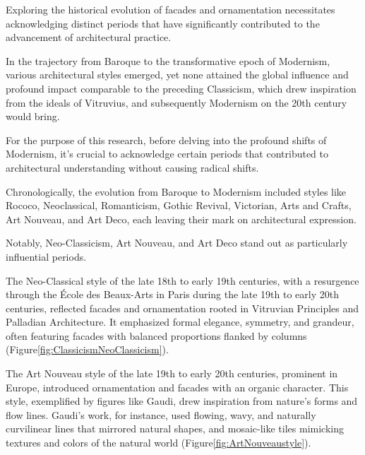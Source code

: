 
Exploring the historical evolution of facades and ornamentation necessitates acknowledging distinct periods that have significantly contributed to the advancement of architectural practice.

In the trajectory from Baroque to the transformative epoch of Modernism, various architectural styles emerged, yet none attained the global influence and profound impact comparable to the preceding Classicism, which drew inspiration from the ideals of Vitruvius, and subsequently Modernism on the 20th century would bring.

For the purpose of this research, before delving into the profound shifts of Modernism, it's crucial to acknowledge certain periods that contributed to architectural understanding without causing radical shifts.

Chronologically, the evolution from Baroque to Modernism included styles like Rococo, Neoclassical, Romanticism, Gothic Revival, Victorian, Arts and Crafts, Art Nouveau, and Art Deco, each leaving their mark on architectural expression.

Notably, Neo-Classicism, Art Nouveau, and Art Deco stand out as particularly influential periods.

The Neo-Classical style of the late 18th to early 19th centuries, with a resurgence through the École des Beaux-Arts in Paris during the late 19th to early 20th centuries, reflected facades and ornamentation rooted in Vitruvian Principles and Palladian Architecture.
It emphasized formal elegance, symmetry, and grandeur, often featuring facades with balanced proportions flanked by columns (Figure\ref{fig:ClassicismNeoClassicism}).

The Art Nouveau style of the late 19th to early 20th centuries, prominent in Europe, introduced ornamentation and facades with an organic character.
This style, exemplified by figures like Gaudi, drew inspiration from nature's forms and flow lines.
Gaudi's work, for instance, used flowing,  wavy,  and  naturally  curvilinear lines that mirrored natural shapes, and mosaic-like tiles mimicking textures and colors of the natural world\cite{Nasir2022} (Figure\ref{fig:ArtNouveaustyle}).

